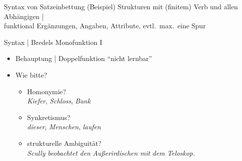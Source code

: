 \begin{frame}
  {Syntax von Satzeinbettung (Beispiel)}
  \alert{Strukturen mit (finitem) Verb und allen Abhängigen} |\\
  funktional Ergänzungen, Angaben, Attribute, evtl.\ max.\ eine Spur\\
  \Zeile
  \centering
\end{frame}

\begin{frame}
  {Syntax | Bredels Monofunktion I}
  \onslide<+->
  \begin{itemize}[<+->]
	  \item Behauptung | \alert{Doppelfunktion "`nicht lernbar"'}
		  \Zeile
    \item Wie bitte?
	    \Halbzeile
	    \begin{itemize}[<+->]
		    \item \alert{Homonymie?}\\
			    \textit{Kiefer}, \textit{Schloss}, \textit{Bank}
			    \Halbzeile
		    \item \alert{Synkretismus?}\\
			    \textit{dieser}, \textit{Menschen}, \textit{laufen}
			    \Halbzeile
		    \item \alert{strukturelle Ambiguität?}\\
			    \textit{Scully beobachtet den Außerirdischen mit dem Teloskop.}
	    \end{itemize}
  \end{itemize}
\end{frame}

